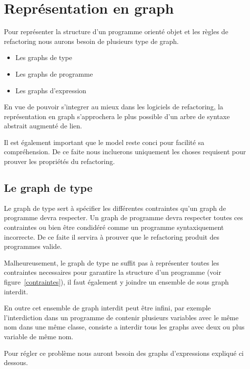 \documentclass[a4paper, 12pt]{article}
\begin{document}
  \section{Représentation en graph}
  Pour représenter la structure d'un programme orienté objet et les règles de refactoring nous aurons besoin de plusieurs type de graph.

  \begin{itemize}[label=\textbullet]
    \item Les graphs de type
    \item Les graphs de programme
    \item Les graphs d'expression
  \end{itemize}

  En vue de pouvoir s'integrer au mieux dans les logiciels de refactoring, la représentation en graph s'approchera le plus possible d'un arbre de syntaxe abstrait augmenté de lien.

  Il est également important que le model reste conci pour facilité sa compréhension. De ce faite nous incluerons uniquement les choses requisent pour prouver les propriétés du refactoring.

  \subsection{Le graph de type}

  Le graph de type sert à spécifier les différentes contraintes qu'un graph de programme devra respecter. Un graph de programme devra respecter toutes ces contraintes ou bien être condidéré comme un programme syntaxiquement incorrecte. De ce faite il servira à prouver que le refactoring produit des programmes valide.

  Malheureusement, le graph de type ne suffit pas à représenter toutes les contraintes necessaires pour garantire la structure d'un programme (voir figure~\ref{contraintes}), il faut également y joindre un ensemble de sous graph interdit.

  En outre cet ensemble de graph interdit peut être infini, par exemple l'interdiction dans un programme de contenir plusieurs variables avec le même nom dans une même classe, consiste a interdir tous les graphs avec deux ou plus variable de même nom.

  Pour régler ce problème nous auront besoin des graphs d'expressions expliqué ci dessous.\label{subsec:graphExpression}
\end{document}
